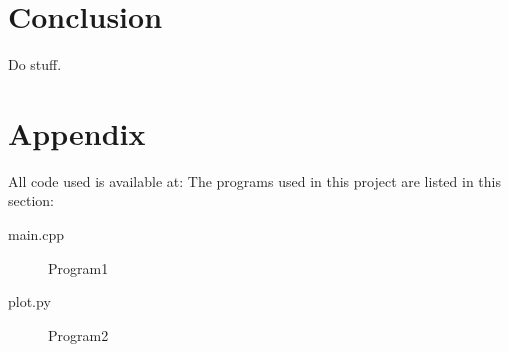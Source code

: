 \documentclass[%
 reprint,
 nobalance,
 amsmath,amssymb,
 aps,
]{revtex4-1}
\begin{document}


\section{Conclusion}
Do stuff.

\section{Appendix}
All code used is available at: %
The programs used in this project are listed in this section:

\begin{description}
\item [main.cpp] Program1
\item [plot.py] Program2
\end{description}

\end{document}
